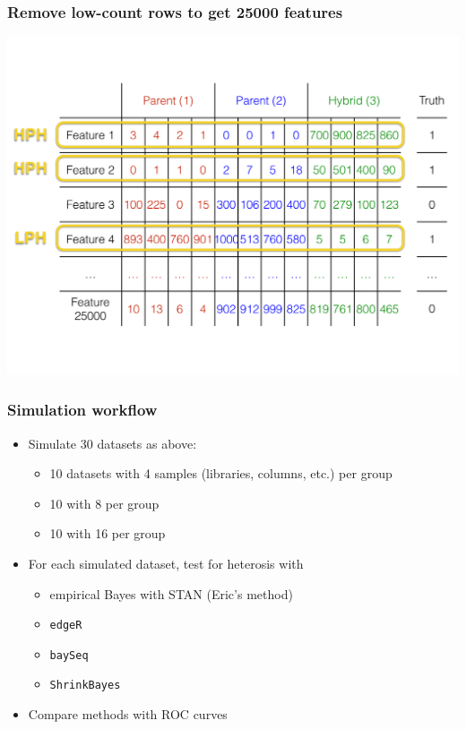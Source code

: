 \documentclass[handout]{beamer}
\numberwithin{equation}{section}
\begin{document}
\begin{frame}
\frametitle{Remove low-count rows to get 25000 features}
\begin{center}
\includegraphics[scale=.28]{data}
\end{center}
\end{frame}

\begin{frame}
\frametitle{Simulation workflow}

\begin{itemize}
\item Simulate 30 datasets as above:
\begin{itemize}
\pause \item 10 datasets with 4 samples (libraries, columns, etc.) per group
\item 10 with 8 per group
\item 10 with 16 per group
\end{itemize}
\pause \item For each simulated dataset, test for heterosis with
\begin{itemize}
\item empirical Bayes with STAN (Eric's method)
\item {\tt edgeR} 
\item {\tt baySeq}
\item {\tt ShrinkBayes}
\end{itemize}
\item Compare methods with ROC curves
\end{itemize}
\end{frame}
\end{document}
